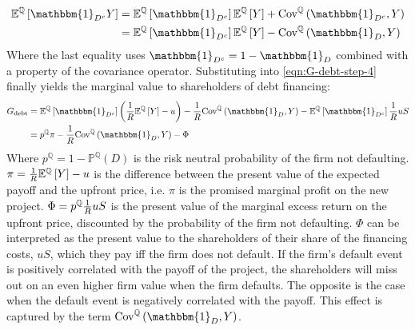 \documentclass[../main.tex]{subfiles}
\begin{document}
            \begin{align}
                \mathbb{E}^{\mathbb{Q}}\left[
                    \mathbbm{1}_{D^{c}}Y
                \right]
                &=
                \mathbb{E}^{\mathbb{Q}}\left[\mathbbm{1}_{D^{c}}\right] 
                \mathbb{E}^{\mathbb{Q}}\left[Y\right] 
                + 
                \text{Cov}^{\mathbb{Q}}\left(\mathbbm{1}_{D^{c}}, Y\right) 
                \nonumber\\
                &=
                \mathbb{E}^{\mathbb{Q}}\left[\mathbbm{1}_{D^{c}}\right] 
                \mathbb{E}^{\mathbb{Q}}\left[Y\right] 
                - 
                \text{Cov}^{\mathbb{Q}}\left(\mathbbm{1}_{D}, Y\right) 
            \end{align}
        Where the last equality uses $\mathbbm{1}_{D^{c}} = 1 - \mathbbm{1}_{D}$ 
        combined with a property of the covariance operator.
        Substituting into \cref{eqn:G-debt-step-4} finally yields the marginal value to shareholders of debt financing:
            \begin{align}
                G_{\text{debt}} &=
                \mathbb{E}^{\mathbb{Q}}\left[\mathbbm{1}_{D^{c}}\right] 
                \left(
                    \discountfactor
                    \mathbb{E}^{\mathbb{Q}}\left[Y\right] 
                    - u
                \right)
                -
                \discountfactor
                \text{Cov}^{\mathbb{Q}}\left(\mathbbm{1}_{D}, Y\right) 
                - 
                \mathbb{E}^{\mathbb{Q}}\left[
                    \mathbbm{1}_{D^{c}}
                \right] \discountfactor u S
                \nonumber \\
                &= 
                p^{\mathbb{Q}} \pi 
                - \discountfactor 
                \text{Cov}^{\mathbb{Q}}\left(
                    \mathbbm{1}_{D}, 
                    Y
                \right) 
                - \Phi
                \label{eqn:marginal-shareholder-value-debt-financing}
            \end{align}
        Where $p^{\mathbb{Q}} = 1 - \mathbb{P}^{\mathbb{Q}}\left(D\right)$ is the risk neutral probability of the firm not defaulting. 
        $\pi = \frac{1}{R} \mathbb{E}^{\mathbb{Q}}\left[Y\right] - u$ 
        is the difference between the present value of the expected payoff and the upfront price, 
        i.e. $\pi$ is the promised marginal profit on the new project. 
        $\Phi = p^{\mathbb{Q}} \frac{1}{R} u S$
        is the present value of the marginal excess return on the upfront price, 
        discounted by the probability of the firm not defaulting.
        $\Phi$ can be interpreted as the present value to the shareholders of their share of the financing costs, $uS$,
        which they pay iff the firm does not default. 
        If the firm's default event is positively correlated with the payoff of the project,
        the shareholders will miss out on an even higher firm value when the firm defaults.
        The opposite is the case when the default event is negatively correlated with the payoff.
        This effect is captured by the term 
        $\text{Cov}^{\mathbb{Q}}\left(\mathbbm{1}_{D}, Y\right)$.
\end{document}
